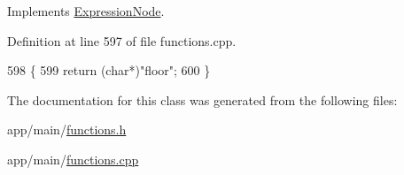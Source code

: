 Implements \hyperlink{classExpressionNode_a42a5e9562b0f645a19dcc83f698069b5}{Expression\+Node}.



Definition at line 597 of file functions.\+cpp.


\begin{DoxyCode}
598 \{
599     \textcolor{keywordflow}{return} (\textcolor{keywordtype}{char}*)\textcolor{stringliteral}{"floor"};
600 \}
\end{DoxyCode}


The documentation for this class was generated from the following files\+:\begin{DoxyCompactItemize}
\item 
app/main/\hyperlink{functions_8h}{functions.\+h}\item 
app/main/\hyperlink{functions_8cpp}{functions.\+cpp}\end{DoxyCompactItemize}
